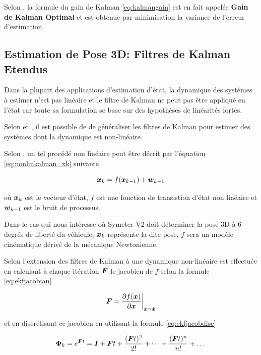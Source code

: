 \documentclass[12pt,a4paper]{report}
\begin{document}
	\para Selon \cite{zarchan_fundamentals_2009}, la formule du gain de Kalman \ref{eq:kalmangain} est en fait appelée \textbf{Gain de Kalman Optimal} et est obtenue par minimisation la variance de l'erreur d'estimation.
	
	
	\subsection{Estimation de Pose 3D: Filtres de Kalman Etendus}
	
	Dans la plupart des applications d'estimation d'état, la dynamique des systèmes à estimer n'est pas linéaire et le filtre de Kalman ne peut pas être appliqué en l'état car toute sa formulation se base sur des hypothèses de linéarités fortes.
	
	\para Selon \cite{menegatti_generalized_2016} et \cite{zarchan_fundamentals_2009}, il est possible de de généraliser les filtres de Kalman pour estimer des systèmes dont la dynamique est non-linéaire.
	
	\para Selon \cite{menegatti_generalized_2016}, un tel procédé non linéaire peut être décrit par l'équation \ref{eq:nonlinkalman_xk} suivante
	
	\begin{equation}
	\label{eq:nonlinkalman_xk}
	\boldsymbol{x}_k = f(\boldsymbol{x}_{k-1}) + \boldsymbol{w}_{k-1}
	\end{equation}
	
	où $\boldsymbol{x}_k$ est le vecteur d'état, $f$ est une fonction de transistion d'état non linéaire et $\boldsymbol{w}_{k-1}$ est le bruit de processus.
	
	\para Dans le cas qui nous intéresse où Symeter V2 doit déterminer la pose 3D à 6 degrés de liberté du véhicule, $\boldsymbol{x}_k$ représente la dite pose, $f$ sera un modèle cinématique dérivé de la mécanique Newtonienne.
	
	\para Selon \cite{zarchan_fundamentals_2009} l'extension des filtres de Kalman à une dynamique non-linéaire est effectuée en calculant à chaque itération $\boldsymbol{F}$ le jacobien de $f$ selon la formule \ref{eq:ekfjacobian}
	
	\begin{equation}
	\label{eq:ekfjacobian}
	\boldsymbol{F} = \frac{\partial f(\boldsymbol{x})}{\partial \boldsymbol{x}} \bigg\rvert_{\boldsymbol{x}= \boldsymbol{\hat{x}}}
	\end{equation}
	
	\para et en discrétisant ce jacobien en utilisant la formule \ref{eq:ekfjacobdisc}
	
	\begin{equation}
	\label{eq:ekfjacobdisc}
	\boldsymbol{\Phi}_k = e^{\boldsymbol Ft} = \boldsymbol I + \boldsymbol Ft + \frac{(\boldsymbol Ft)^2}{2!} + \dots + \frac{(\boldsymbol Ft)^n}{n!} + \dots
	\end{equation}
	
\end{document}
